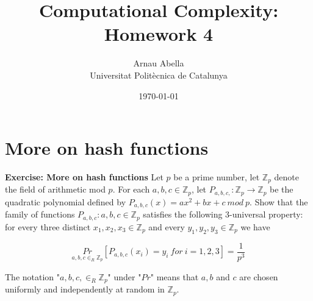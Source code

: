 \documentclass[12pt, a4paper]{article} %
\title{%
  Computational Complexity: Homework 4
}
\author{%
  Arnau Abella \\
  \large{Universitat Polit\`ecnica de Catalunya}
}
\date{\today}
\theoremstyle{definition}
\newcommand{\Z}{\mathbb{Z}}
\begin{document}
\maketitle


\section{More on hash functions}

\textbf{Exercise: More on hash functions} \quad Let $p$ be a prime number, let $\Z_p$ denote the field of arithmetic mod $p$. For each $a,b,c \in \Z_p$, let ${P_{a,b,c,} : \Z_p \to \Z_p}$ be the quadratic polynomial defined by $P_{a,b,c}(x) = ax^2 + bx + c \ mod \ p$. Show that the family of functions ${ P_{a,b,c}: a,b,c \in \Z_p}$ satisfies the following 3-universal property: for every three distinct $x_1, x_2, x_3 \in \Z_p$ and every $y_1, y_2, y_3 \in \Z_p$ we have

\begin{equation}\label{eq:one}
  \underset{a,b,c \in_R \Z_p}{Pr} [ P_{a,b,c}(x_i) = y_i \ for \ i = 1,2,3] = \frac{1}{p^3}
\end{equation}

The notation "$a,b,c, \in_R \Z_p$" under "$Pr$" means that $a,b$ and $c$ are chosen uniformly and independently at random in $\Z_p$.
\end{document}
